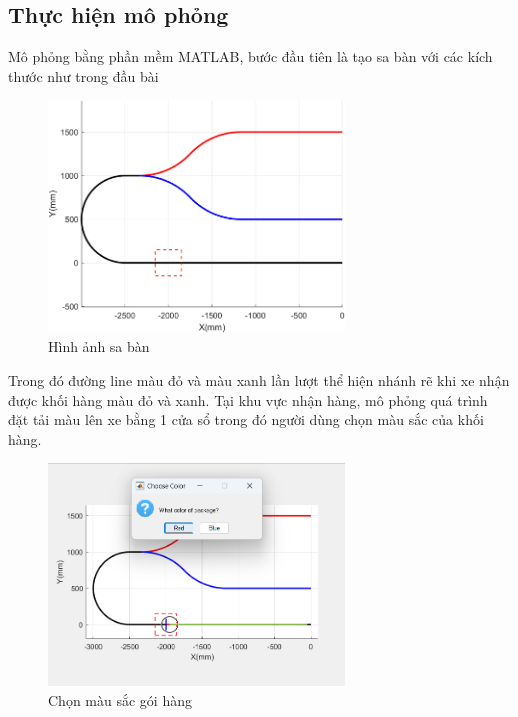           \subsection{Thực hiện mô phỏng}
               \hspace*{0.6cm}Mô phỏng bằng phần mềm MATLAB, bước đầu tiên là tạo sa bàn với các kích thước như trong đầu bài
               \begin{figure}[H]
                    \centering
                    \includegraphics[width=0.7\textwidth]{pictures/chapter8/saban.png}
                    \caption{Hình ảnh sa bàn}
                    \label{saban}
               \end{figure}
               \hspace*{0.6cm}Trong đó đường line màu đỏ và màu xanh lần lượt thể hiện nhánh rẽ khi xe nhận được khối hàng màu đỏ và xanh. Tại khu vực nhận hàng, mô phỏng quá trình đặt tải màu lên xe bằng 1 cửa sổ trong đó người dùng chọn màu sắc của khối hàng.
               \begin{figure}[H]
                    \centering
                    \includegraphics[width=0.7\textwidth]{pictures/chapter8/stop_for_package.png}
                    \caption{Chọn màu sắc gói hàng}
                    \label{choose_color}
               \end{figure}
